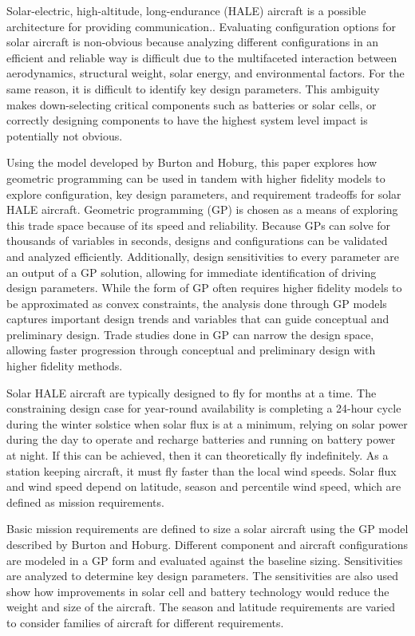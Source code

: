 \documentclass[]{aiaa-tc}%
\begin{document}
Solar-electric, high-altitude, long-endurance (HALE) aircraft is a possible architecture for providing communication.\cite{aquila}.
Evaluating configuration options for solar aircraft is non-obvious because analyzing different configurations in an efficient and reliable way is difficult due to the multifaceted interaction between aerodynamics, structural weight, solar energy, and environmental factors.\cite{solartech}
For the same reason, it is difficult to identify key design parameters.  
This ambiguity makes down-selecting critical components such as batteries or solar cells, or correctly designing components to have the highest system level impact is potentially not obvious.  

Using the model developed by Burton and Hoburg\cite{burton_solar_2017}, this paper explores how geometric programming can be used in tandem with higher fidelity models to explore configuration, key design parameters, and requirement tradeoffs for solar HALE aircraft.
Geometric programming (GP) is chosen as a means of exploring this trade space because of its speed and reliability.  
Because GPs can solve for thousands of variables in seconds\cite{gp}, designs and configurations can be validated and analyzed efficiently.  
Additionally, design sensitivities to every parameter are an output of a GP solution, allowing for immediate identification of driving design parameters. 
While the form of GP often requires higher fidelity models to be approximated as convex constraints\cite{gpkit}, the analysis done through GP models captures important design trends and variables that can guide conceptual and preliminary design. 
Trade studies done in GP can narrow the design space, allowing faster progression through conceptual and preliminary design with higher fidelity methods. 
 
Solar HALE aircraft are typically designed to fly for months at a time.\cite{aquila}  
The constraining design case for year-round availability is completing a 24-hour cycle during the winter solstice when solar flux is at a minimum, relying on solar power during the day to operate and recharge batteries and running on battery power at night. 
If this can be achieved, then it can theoretically fly indefinitely.  
As a station keeping aircraft, it must fly faster than the local wind speeds. 
Solar flux and wind speed depend on latitude, season and percentile wind speed, which are defined as mission requirements.

Basic mission requirements are defined to size a solar aircraft using the GP model described by Burton and Hoburg.\cite{burton_solar_2017}
Different component and aircraft configurations are modeled in a GP form and evaluated against the baseline sizing. 
Sensitivities are analyzed to determine key design parameters. 
The sensitivities are also used show how improvements in solar cell and battery technology would reduce the weight and size of the aircraft. 
The season and latitude requirements are varied to consider families of aircraft for different requirements.  
\end{document}
